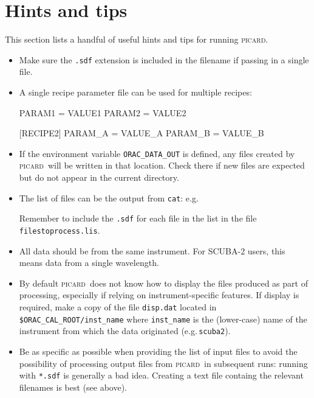 \documentclass[twoside,11pt,nolof]{starlink}
\providecommand{\picard}{\textsc{picard}}
\begin{document}
\section{Hints and tips\label{se:hints}}

This section lists a handful of useful hints and tips for running
\picard.

\begin{itemize}

\item
Make sure the \verb+.sdf+ extension is included in the filename if
passing in a single file.

\item A single recipe parameter file can be used for multiple recipes:
\begin{terminalv}
[RECIPE1]
PARAM1 = VALUE1
PARAM2 = VALUE2

[RECIPE2]
PARAM_A = VALUE_A
PARAM_B = VALUE_B
\end{terminalv}

\item If the environment variable \verb+ORAC_DATA_OUT+ is defined, any
  files created by \picard\ will be written in that location. Check
  there if new files are expected but do not appear in the current
  directory.

\item The list of files can be the output from \texttt{cat}: e.g.\
\begin{terminalv}
\end{terminalv}
Remember to include the \verb+.sdf+ for each file in the list in the
file \verb+filestoprocess.lis+.

\item All data should be from the same instrument. For SCUBA-2 users,
  this means data from a single wavelength.

\item By default \picard\ does not know how to display the files
  produced as part of processing, especially if relying on
  instrument-specific features. If display is required, make a copy of
  the file \texttt{disp.dat} located in
  \verb+$ORAC_CAL_ROOT/inst_name+ where \verb+inst_name+ is the
  (lower-case) name of the instrument from which the data originated
  (e.g.\,\verb+scuba2+).

\item Be as specific as possible when providing the list of input
  files to avoid the possibility of processing output files from
  \picard\ in subsequent runs: running with \verb+*.sdf+ is generally
  a bad idea. Creating a text file containg the relevant filenames is
  best (see above).

\end{itemize}
\end{document}
